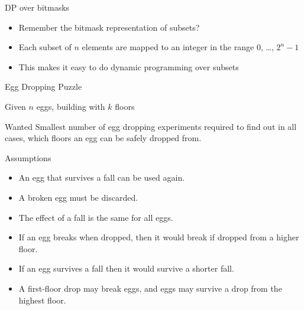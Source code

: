    \begin{frame}[fragile]{DP over bitmasks}
    \begin{itemize}
        \item Remember the bitmask representation of subsets?
        \item Each subset of $n$ elements are mapped to an integer in the range $0$, \ldots, $2^{n} - 1$
        \item This makes it easy to do dynamic programming over subsets
    \end{itemize}
\end{frame}

   \begin{frame}[fragile]{Egg Dropping Puzzle}
\begin{block}{Given}
$n$ eggs, building with $k$ floors
\end{block}

\begin{block}{Wanted}
Smallest number of egg dropping experiments required
to find out in all cases,
which floors an egg can be safely dropped from.
\end{block}

\end{frame}

   \begin{frame}[fragile]{Assumptions}

\begin{itemize}
\item An egg that survives a fall can be used again.

\item A broken egg must be discarded.

\item The effect of a fall is the same for all eggs.

\item If an egg breaks when dropped, 
then it would break if dropped from a higher floor.

\item If an egg survives a fall then it would survive a shorter fall.

\item A first-floor drop may break eggs, and eggs may survive
a drop from the highest floor.
\end{itemize}

\end{frame}


